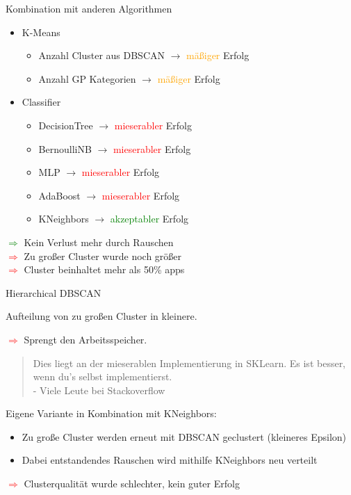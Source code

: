 \documentclass[compress,t]{beamer}
\begin{document}
\begin{frame}{Kombination mit anderen Algorithmen}

    \begin{itemize}
        \item K-Means
            \begin{itemize}
                \item Anzahl Cluster aus DBSCAN \(\rightarrow\) \textcolor{orange}{mäßiger} Erfolg
                \item Anzahl GP Kategorien \(\rightarrow\) \textcolor{orange}{mäßiger} Erfolg
            \end{itemize}
        \item Classifier
            \begin{itemize}
                \item DecisionTree \(\rightarrow\) \textcolor{red}{mieserabler} Erfolg
                \item BernoulliNB \(\rightarrow\) \textcolor{red}{mieserabler} Erfolg
                \item MLP \(\rightarrow\) \textcolor{red}{mieserabler} Erfolg
                \item AdaBoost \(\rightarrow\) \textcolor{red}{mieserabler} Erfolg
                \item KNeighbors  \(\rightarrow\) \textcolor{green}{akzeptabler} Erfolg
            \end{itemize}
    \end{itemize}

    \textcolor{green}{\(\Rightarrow\)} Kein Verlust mehr durch Rauschen\\
    \textcolor{red}{\(\Rightarrow\)} Zu großer Cluster wurde noch größer\\
    \textcolor{red}{\(\Rightarrow\)} Cluster beinhaltet mehr als 50\% apps

\end{frame}

\begin{frame}{Hierarchical DBSCAN}

    Aufteilung von zu großen Cluster in kleinere.

    \textcolor{red}{\(\Rightarrow\)} Sprengt den Arbeitsspeicher.
    \begin{quote}
        Dies liegt an der mieserablen Implementierung in SKLearn.
        Es ist besser, wenn du's selbst implementierst.\\
        - Viele Leute bei Stackoverflow
    \end{quote}

    Eigene Variante in Kombination mit KNeighbors:
    \begin{itemize}
        \item Zu große Cluster werden erneut mit DBSCAN geclustert (kleineres Epsilon)
        \item Dabei entstandendes Rauschen wird mithilfe KNeighbors neu verteilt
    \end{itemize}

    \textcolor{red}{\(\Rightarrow\)} Clusterqualität wurde schlechter, kein guter Erfolg

\end{frame}
\end{document}
